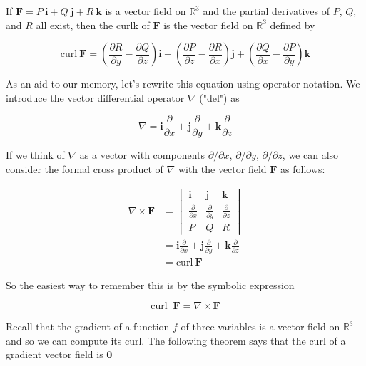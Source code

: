 \documentclass{article}
\begin{document}
If $\mathbf{F} = P \ \mathbf{i} + Q \ \mathbf{j} + R \  \mathbf{k}$ is a vector field on $\mathbb{R}^3$ and the partial derivatives of $P$, $Q$, and $R$ all exist, then the curlk of $\mathbf{F}$ is the vector field on $\mathbb{R}^3$ defined by 

\begin{equation*}
    \text{curl} \ \mathbf{F} = (\frac{\partial R}{\partial y} - \frac{\partial Q}{\partial z}) \mathbf{i} + (\frac{\partial P}{\partial z} - \frac{\partial R}{\partial x}) \mathbf{j} + (\frac{\partial Q}{\partial x} - \frac{\partial P}{\partial y}) \mathbf{k}
\end{equation*}

As an aid to our memory, let's rewrite this equation using operator notation. We introduce the vector differential operator $\nabla$ ("del") as 

\begin{equation*}
    \nabla = \mathbf{i} \frac{\partial}{\partial x} + \mathbf{j} \frac{\partial}{ \partial y} + \mathbf{k} \frac{\partial}{\partial z}
\end{equation*}

If we think of $\nabla$ as a vector with components $\partial/\partial x$, $\partial/\partial y$, $\partial/\partial z$, we can also consider the formal cross product of $\nabla$ with the vector field $\mathbf{F}$ as follows:

\begin{align*}
    \nabla \times \mathbf{F} & = \begin{vmatrix}
        \mathbf{i} & \mathbf{j} & \mathbf{k} \\[6pt]
        \frac{\partial }{\partial x} & \frac{\partial}{\partial y} & \frac{\partial}{ \partial z} \\[6pt]
        P & Q & R
    \end{vmatrix} \\
    & = \mathbf{i} \frac{\partial}{\partial x} + \mathbf{j} \frac{\partial}{ \partial y} + \mathbf{k} \frac{\partial}{\partial z} \\
    & = \text{curl} \ \mathbf{F}
\end{align*}

So the easiest way to remember this is by the symbolic expression 

\begin{equation*}
    \text{curl } \ \mathbf{F} = \nabla \times \mathbf{F}
\end{equation*}

Recall that the gradient of a function $f$ of three variables is a vector field on $\mathbb{R}^3$ and so we can compute its curl. The following theorem says that the curl of a gradient vector field is $\mathbf{0}$
\end{document}
